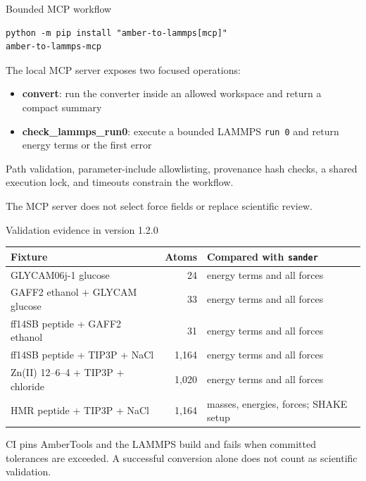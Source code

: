 \documentclass[aspectratio=169,11pt]{beamer}
\begin{document}
\begin{frame}[fragile]{Bounded MCP workflow}
\begin{lstlisting}[style=terminal]
python -m pip install "amber-to-lammps[mcp]"
amber-to-lammps-mcp
\end{lstlisting}

The local MCP server exposes two focused operations:
\begin{itemize}
  \item \textbf{convert}: run the converter inside an allowed workspace and return a compact summary
  \item \textbf{check\_lammps\_run0}: execute a bounded LAMMPS \texttt{run 0} and return energy terms or the first error
\end{itemize}

Path validation, parameter-include allowlisting, provenance hash checks, a shared execution lock, and timeouts constrain the workflow.

\alert{The MCP server does not select force fields or replace scientific review.}
\end{frame}

\begin{frame}{Validation evidence in version 1.2.0}
\small
\begin{tabular}{@{}p{}rp{}@{}}
\toprule
\textbf{Fixture} & \textbf{Atoms} & \textbf{Compared with \texttt{sander}} \\
\midrule
GLYCAM06j-1 glucose & 24 & energy terms and all forces \\
GAFF2 ethanol + GLYCAM glucose & 33 & energy terms and all forces \\
ff14SB peptide + GAFF2 ethanol & 31 & energy terms and all forces \\
ff14SB peptide + TIP3P + NaCl & 1,164 & energy terms and all forces \\
Zn(II) 12--6--4 + TIP3P + chloride & 1,020 & energy terms and all forces \\
HMR peptide + TIP3P + NaCl & 1,164 & masses, energies, forces; SHAKE setup \\
\bottomrule
\end{tabular}
\vspace{0.4cm}

CI pins AmberTools and the LAMMPS build and fails when committed tolerances are exceeded. A successful conversion alone does not count as scientific validation.
\end{frame}
\end{document}
